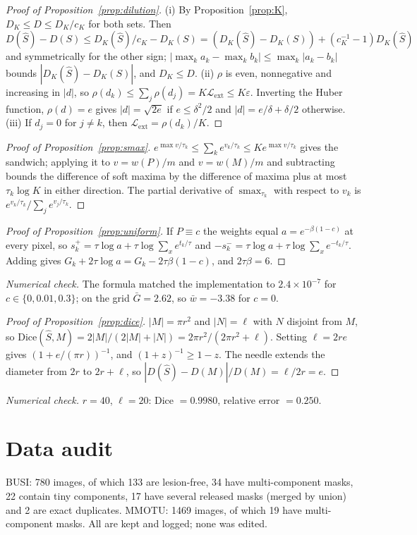 \documentclass{midl}
\DeclareMathOperator{\smax}{smax}
\begin{document}
\begin{proof}[Proof of Proposition~\ref{prop:dilution}]
(i) By Proposition~\ref{prop:K}, $D_K\le D\le D_K/c_K$ for both sets. Then $D(\hat S)-D(S)\le D_K(\hat S)/c_K-D_K(S)=(D_K(\hat S)-D_K(S))+(c_K^{-1}-1)D_K(\hat S)$ and symmetrically for the other sign; $|\max_ka_k-\max_kb_k|\le\max_k|a_k-b_k|$ bounds $|D_K(\hat S)-D_K(S)|$, and $D_K\le D$. (ii) $\rho$ is even, nonnegative and increasing in $|d|$, so $\rho(d_k)\le\sum_j\rho(d_j)=K\mathcal{L}_{\mathrm{ext}}\le K\varepsilon$. Inverting the Huber function, $\rho(d)=e$ gives $|d|=\sqrt{2e}$ if $e\le\delta^2/2$ and $|d|=e/\delta+\delta/2$ otherwise. (iii) If $d_j=0$ for $j\ne k$, then $\mathcal{L}_{\mathrm{ext}}=\rho(d_k)/K$.
\end{proof}

\begin{proof}[Proof of Proposition~\ref{prop:smax}]
$e^{\max v/\tau_k}\le\sum_ke^{v_k/\tau_k}\le Ke^{\max v/\tau_k}$ gives the sandwich; applying it to $v=w(P)/m$ and $v=w(M)/m$ and subtracting bounds the difference of soft maxima by the difference of maxima plus at most $\tau_k\log K$ in either direction. The partial derivative of $\smax_{\tau_k}$ with respect to $v_k$ is $e^{v_k/\tau_k}/\sum_je^{v_j/\tau_k}$.
\end{proof}

\begin{proof}[Proof of Proposition~\ref{prop:uniform}]
If $P\equiv c$ the weights equal $a=e^{-\beta(1-c)}$ at every pixel, so $s_k^{+}=\tau\log a+\tau\log\sum_xe^{t_k/\tau}$ and $-s_k^{-}=\tau\log a+\tau\log\sum_xe^{-t_k/\tau}$. Adding gives $G_k+2\tau\log a=G_k-2\tau\beta(1-c)$, and $2\tau\beta=6$.
\end{proof}
\emph{Numerical check.} The formula matched the implementation to $2.4\times10^{-7}$ for $c\in\{0,0.01,0.3\}$; on the grid $\bar G=2.62$, so $\bar w=-3.38$ for $c=0$.

\begin{proof}[Proof of Proposition~\ref{prop:dice}]
$|M|=\pi r^2$ and $|N|=\ell$ with $N$ disjoint from $M$, so $\mathrm{Dice}(\hat S,M)=2|M|/(2|M|+|N|)=2\pi r^2/(2\pi r^2+\ell)$. Setting $\ell=2re$ gives $(1+e/(\pi r))^{-1}$, and $(1+z)^{-1}\ge1-z$. The needle extends the diameter from $2r$ to $2r+\ell$, so $|D(\hat S)-D(M)|/D(M)=\ell/2r=e$.
\end{proof}
\emph{Numerical check.} $r=40$, $\ell=20$: Dice $=0.9980$, relative error $=0.250$.


\section{Data audit}\label{app:audit}
BUSI: 780 images, of which 133 are lesion-free, 34 have multi-component masks, 22 contain tiny components, 17 have several released masks (merged by union) and 2 are exact duplicates. MMOTU: 1469 images, of which 19 have multi-component masks. All are kept and logged; none was edited.
\end{document}
